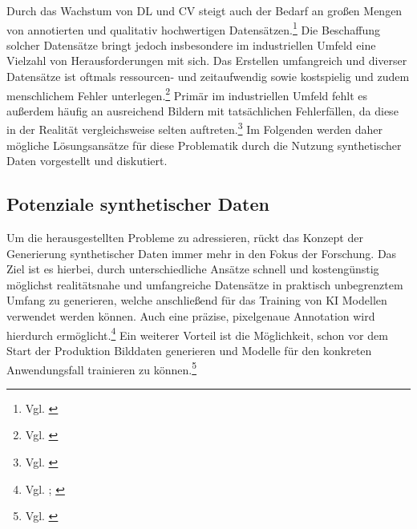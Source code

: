 Durch das Wachstum von \ac{DL} und \ac{CV} steigt auch der Bedarf an großen Mengen von annotierten und qualitativ hochwertigen Datensätzen.\footnote{Vgl. \cite[S. 767]{monnet_investigating_2024}} Die Beschaffung solcher Datensätze bringt jedoch insbesondere im industriellen Umfeld eine Vielzahl von Herausforderungen mit sich. Das Erstellen umfangreich und diverser Datensätze ist oftmals ressourcen- und zeitaufwendig sowie kostspielig und zudem menschlichem Fehler unterlegen.\footnote{Vgl. \cite[250]{urgo_monitoring_2024}} Primär im industriellen Umfeld fehlt es außerdem häufig an ausreichend Bildern mit tatsächlichen Fehlerfällen, da diese in der Realität vergleichsweise selten auftreten.\footnote{Vgl. \cite[S. 768]{monnet_investigating_2024}} Im Folgenden werden daher mögliche Lösungsansätze für diese Problematik durch die Nutzung synthetischer Daten vorgestellt und diskutiert.

\subsection{Potenziale synthetischer Daten}
Um die herausgestellten Probleme zu adressieren, rückt das Konzept der Generierung synthetischer Daten immer mehr in den Fokus der Forschung. Das Ziel ist es hierbei, durch unterschiedliche Ansätze schnell und kostengünstig möglichst realitätsnahe und umfangreiche Datensätze in praktisch unbegrenztem Umfang zu generieren, welche anschließend für das Training von \ac{KI} Modellen verwendet werden können. Auch eine präzise, pixelgenaue Annotation wird hierdurch ermöglicht.\footnote{Vgl. \cite[S. 768]{monnet_investigating_2024}; \cite[S. 250]{urgo_monitoring_2024}} Ein weiterer Vorteil ist die Möglichkeit, schon vor dem Start der Produktion Bilddaten generieren und Modelle für den konkreten Anwendungsfall trainieren zu können.\footnote{Vgl. \cite[S. 768]{monnet_investigating_2024}} 

